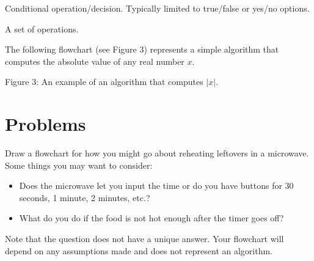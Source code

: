 \documentclass{ximera}
\begin{document}
\begin{center}
\end{center}
\begin{center}
	Conditional operation/decision. Typically limited to true/false or yes/no options.
\end{center}

\begin{center}
\end{center}
\begin{center}
	A set of operations.
\end{center}

The following flowchart (see Figure 3) represents a simple algorithm that computes the absolute value of any real number $x$.

\begin{center}
\end{center}
\begin{center}
	Figure 3: An example of an algorithm that computes $|x|$.
\end{center}

\section{Problems}

\begin{question}
	Draw a flowchart for how you might go about reheating leftovers in a microwave. Some things you may want to consider:
	\begin{itemize}
		\item Does the microwave let you input the time or do you have buttons for 30 seconds, 1 minute, 2 minutes, etc.?
		\item What do you do if the food is not hot enough after the timer goes off?
	\end{itemize}
	Note that the question does not have a unique answer. Your flowchart will depend on any assumptions made and does not represent an algorithm.
\end{question}
\end{document}
